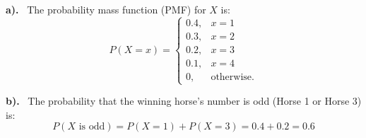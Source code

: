 \documentclass[a4paper, 10pt]{article}
\begin{document}
\begin{solution}
	\par\noindent\textbf{a).} \, The probability mass function (PMF) for \( X \) is:
	\[\boxed{
			P(X = x) =
			\begin{cases}
				0.4, & x=1               \\
				0.3, & x=2               \\
				0.2, & x=3               \\
				0.1, & x=4               \\
				0,   & \text{otherwise.}
			\end{cases}
		}\]

	\myspace

	\par\noindent\textbf{b).} \, The probability that the winning horse's number is odd (Horse 1 or Horse 3) is:
	\[
		P(X \text{ is odd}) = P(X = 1) + P(X = 3) = 0.4 + 0.2 = \boxed{0.6}
	\]
\end{solution}
\end{document}
